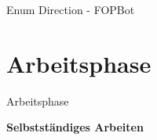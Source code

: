 \documentclass{../tuda-beamer}
\begin{document}
    \begin{frame}{Enum Direction - FOPBot}
        
    \end{frame}


    \section{Arbeitsphase}
    \begin{frame}[c]{Arbeitsphase}
        \begin{center}
            \textbf{\LARGE Selbstständiges Arbeiten}
        \end{center}
    \end{frame}
\end{document}
